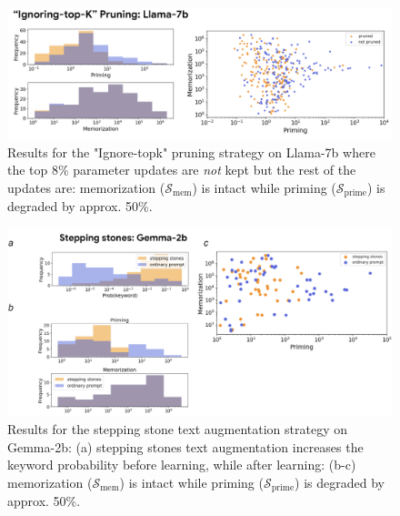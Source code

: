 \documentclass[11pt, a4paper, logo, copyright]{googledeepmind}
\theoremstyle{plain}
\theoremstyle{definition}
\theoremstyle{remark}
\begin{document}
\begin{figure}[h]
\vspace{0mm}
    \centering \includegraphics[scale=.38,clip]{figures/pruning_llama.png}
    \vspace{-1mm}
    \caption{Results for the "Ignore-topk" pruning strategy on Llama-7b where the top $8\%$ parameter updates are \textit{not} kept but the rest of the updates are: memorization ($\mathcal{S}_\text{mem}$) is intact while priming ($\mathcal{S}_\text{prime}$) is degraded by approx. 50\%.} \label{fig:pruning_llama}
  \vspace{-0mm}
\end{figure}


\begin{figure}[h]
\vspace{0mm}
    \centering \includegraphics[scale=.35,clip]{figures/stones_gemma.png}
    \vspace{-1mm}
    \caption{Results for the stepping stone text augmentation strategy on Gemma-2b: (a) stepping stones text augmentation increases the keyword probability before learning, while after learning: (b-c) memorization ($\mathcal{S}_\text{mem}$) is intact while priming ($\mathcal{S}_\text{prime}$) is degraded by approx. 50\%.} \label{fig:stones_gemma}
  \vspace{-0mm}
\end{figure}
\end{document}
